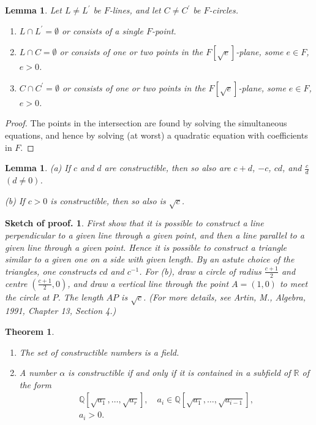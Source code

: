 \documentclass[a4paper,11pt,final,openany]{memoir}
\newtheorem{lemma}[X]{Lemma}
\newtheorem{theorem}[X]{Theorem}
\theoremstyle{nonumberplain}
\newtheorem{proof}{Proof.}
\newtheorem{sproof}{Sketch of proof.}
\begin{document}
\begin{lemma}
\label{ef24} Let $L\neq L^{\prime}$ be $F$-lines, and let $C\neq C^{\prime} $
be $F$-circles.

\begin{enumerate}
\item $L\cap L^{\prime}=\emptyset$ or consists of a single $F$-point.

\item $L\cap C=\emptyset$ or consists of one or two points in the $F[\sqrt
{e}]$-plane, some $e\in F$, $e>0$.

\item $C\cap C^{\prime}=\emptyset$ or consists of one or two points in the
$F[\sqrt{e}]$-plane, some $e\in F$, $e>0$.
\end{enumerate}
\end{lemma}

\begin{proof}
The points in the intersection are found by solving the simultaneous
equations, and hence by solving (at worst) a quadratic equation with
coefficients in $F$.
\end{proof}

\begin{lemma}
\label{ef25} (a) If $c$ and $d$ are constructible, then so also are $c+d$,
$-c$, $cd$, and $\frac{c}{d}$ $(d\neq0)$.

(b) If $c>0$ is constructible, then so also is $\sqrt c$.
\end{lemma}

\begin{sproof}
First show that it is possible to construct a line perpendicular to a given
line through a given point, and then a line parallel to a given line through a
given point. Hence it is possible to construct a triangle similar to a given
one on a side with given length. By an astute choice of the triangles, one
constructs $cd$ and $c^{-1}$. For (b), draw a circle of radius $\frac{c+1}{2}$
and centre $(\frac{c+1}{2},0)$, and draw a vertical line through the point
$A=(1,0)$ to meet the circle at $P$. The length $AP$ is $\sqrt{c}$. (For more
details, see Artin, M., Algebra, 1991, Chapter 13, Section 4.)
\end{sproof}

\begin{theorem}
\label{ef26}%
%


\begin{enumerate}
\item The set of constructible numbers is a field.

\item A number $\alpha$ is constructible if and only if it is contained in a
subfield of $\mathbb{R}{}$ of the form
\begin{align*}
\mathbb{Q}{}[\sqrt{a_{1}},\ldots,\sqrt{a_{r}}],\quad a_{i}\in\mathbb{Q}%
{}[\sqrt{a_{1}},\ldots,\sqrt{a_{i-1}}],\\
 a_{i}>0\text{.}%
\end{align*}

\end{enumerate}
\end{theorem}
\end{document}
